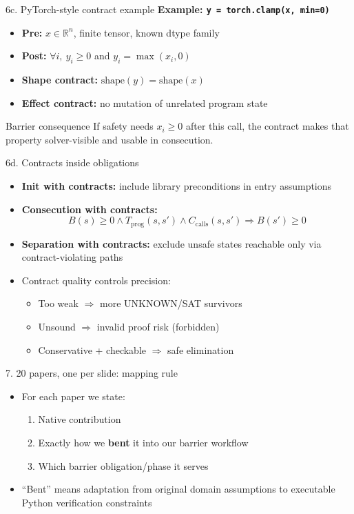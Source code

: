 \documentclass[aspectratio=169]{beamer}
\begin{document}
\begin{frame}{6c. PyTorch-style contract example}
\textbf{Example: \texttt{y = torch.clamp(x, min=0)}}
\begin{itemize}
  \item \textbf{Pre:} \(x\in\mathbb{R}^n\), finite tensor, known dtype family
  \item \textbf{Post:} \(\forall i,\ y_i\ge 0\) and \(y_i = \max(x_i,0)\)
  \item \textbf{Shape contract:} \(\text{shape}(y)=\text{shape}(x)\)
  \item \textbf{Effect contract:} no mutation of unrelated program state
\end{itemize}
\begin{block}{Barrier consequence}
If safety needs \(x_i\ge 0\) after this call, the contract makes that property solver-visible and usable in consecution.
\end{block}
\end{frame}

\begin{frame}{6d. Contracts inside obligations}
\begin{itemize}
  \item \textbf{Init with contracts:} include library preconditions in entry assumptions
  \item \textbf{Consecution with contracts:}
  \[
  B(s)\ge0\wedge T_{\text{prog}}(s,s')\wedge C_{\text{calls}}(s,s')\Rightarrow B(s')\ge0
  \]
  \item \textbf{Separation with contracts:} exclude unsafe states reachable only via contract-violating paths
  \item Contract quality controls precision:
  \begin{itemize}
    \item Too weak \(\Rightarrow\) more UNKNOWN/SAT survivors
    \item Unsound \(\Rightarrow\) invalid proof risk (forbidden)
    \item Conservative + checkable \(\Rightarrow\) safe elimination
  \end{itemize}
\end{itemize}
\end{frame}

\begin{frame}{7. 20 papers, one per slide: mapping rule}
\begin{itemize}
  \item For each paper we state:
  \begin{enumerate}
    \item Native contribution
    \item Exactly how we \textbf{bent} it into our barrier workflow
    \item Which barrier obligation/phase it serves
  \end{enumerate}
  \item ``Bent'' means adaptation from original domain assumptions to executable Python verification constraints
\end{itemize}
\end{frame}
\end{document}
